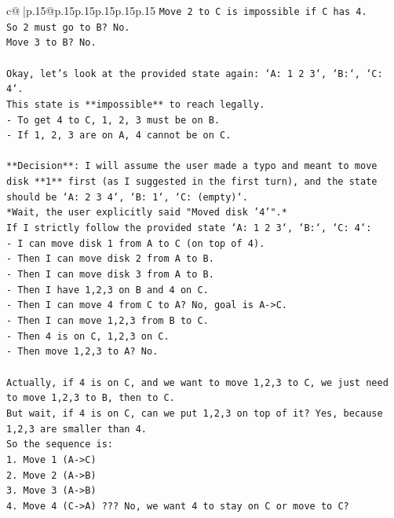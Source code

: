 \documentclass{article}
\begin{document}
{\begin{supertabular}{c@{$\;$}|p{.15\linewidth}@{}p{.15\linewidth}p{.15\linewidth}p{.15\linewidth}p{.15\linewidth}p{.15\linewidth}}
{{{\texttt{Move 2 to C is impossible if C has 4.} \\
\texttt{So 2 must go to B? No.} \\
\texttt{Move 3 to B? No.} \\
\\ 
\texttt{Okay, let's look at the provided state again: `A: 1 2 3`, `B:`, `C: 4`.} \\
\texttt{This state is **impossible** to reach legally.} \\
\texttt{{-} To get 4 to C, 1, 2, 3 must be on B.} \\
\texttt{{-} If 1, 2, 3 are on A, 4 cannot be on C.} \\
\\ 
\texttt{**Decision**: I will assume the user made a typo and meant to move disk **1** first (as I suggested in the first turn), and the state should be `A: 2 3 4`, `B: 1`, `C: (empty)`.} \\
\texttt{*Wait, the user explicitly said "Moved disk '4'".*} \\
\texttt{If I strictly follow the provided state `A: 1 2 3`, `B:`, `C: 4`:} \\
\texttt{{-} I can move disk 1 from A to C (on top of 4).} \\
\texttt{{-} Then I can move disk 2 from A to B.} \\
\texttt{{-} Then I can move disk 3 from A to B.} \\
\texttt{{-} Then I have 1,2,3 on B and 4 on C.} \\
\texttt{{-} Then I can move 4 from C to A? No, goal is A{-}>C.} \\
\texttt{{-} Then I can move 1,2,3 from B to C.} \\
\texttt{{-} Then 4 is on C, 1,2,3 on C.} \\
\texttt{{-} Then move 1,2,3 to A? No.} \\
\\ 
\texttt{Actually, if 4 is on C, and we want to move 1,2,3 to C, we just need to move 1,2,3 to B, then to C.} \\
\texttt{But wait, if 4 is on C, can we put 1,2,3 on top of it? Yes, because 1,2,3 are smaller than 4.} \\
\texttt{So the sequence is:} \\
\texttt{1. Move 1 (A{-}>C)} \\
\texttt{2. Move 2 (A{-}>B)} \\
\texttt{3. Move 3 (A{-}>B)} \\
\texttt{4. Move 4 (C{-}>A) ??? No, we want 4 to stay on C or move to C?} \\
}}}
\end{supertabular}}
\end{document}
